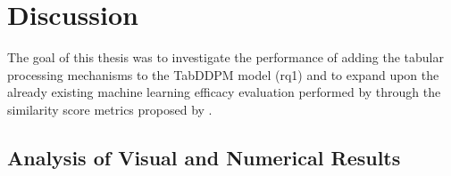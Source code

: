 



\newpage
\section{Discussion}
\label{ch:results-discussion}
The goal of this thesis was to investigate the performance of adding the tabular processing mechanisms to the TabDDPM model (\gls{rq}1) and
to expand upon the already existing machine learning efficacy evaluation performed by \cite{kotelnikov2022TabDDPMModellingTabular} through the similarity score metrics proposed by \cite{chundawat2022UniversalMetricRobust}.

\subsection*{Analysis of Visual and Numerical Results}

